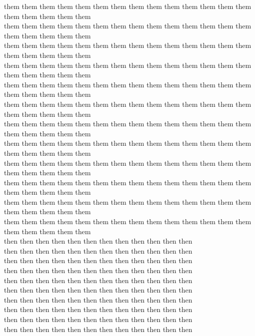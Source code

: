 them them them them them them them them them them them them them them them them them them them\\
them them them them them them them them them them them them them them them them them them them\\
them them them them them them them them them them them them them them them them them them them\\
them them them them them them them them them them them them them them them them them them them\\
them them them them them them them them them them them them them them them them them them them\\
them them them them them them them them them them them them them them them them them them them\\
them them them them them them them them them them them them them them them them them them them\\
them them them them them them them them them them them them them them them them them them them\\
them them them them them them them them them them them them them them them them them them them\\
them them them them them them them them them them them them them them them them them them them\\
them them them them them them them them them them them them them them them them them them them\\
them them them them them them them them them them them them them them them them them them them\\
then then then then then then then then then then then then\\
then then then then then then then then then then then then\\
then then then then then then then then then then then then\\
then then then then then then then then then then then then\\
then then then then then then then then then then then then\\
then then then then then then then then then then then then\\
then then then then then then then then then then then then\\
then then then then then then then then then then then then\\
then then then then then then then then then then then then\\
then then then then then then then then then then then then\\
